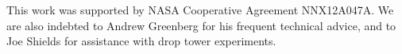 \documentclass[aip,reprint, floatfix]{revtex4-1}
\begin{document}
\begin{acknowledgments}
This work was supported by NASA Cooperative Agreement NNX12A047A. We are also indebted to Andrew Greenberg for his frequent technical advice, and to Joe Shields for assistance with drop tower experiments.
\end{acknowledgments}


%
%

%



\end{document}
